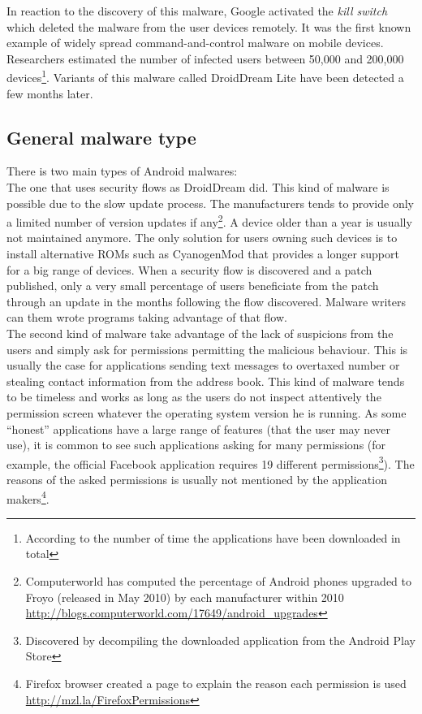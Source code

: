 In reaction to the discovery of this malware, Google activated the \emph{kill switch} which deleted the malware from the user devices remotely.
It was the first known example of widely spread command-and-control malware on mobile devices.
Researchers estimated the number of infected users between 50,000 and 200,000 devices\footnote{According to the number of time the applications have been downloaded in total}.
Variants of this malware called DroidDream Lite have been detected a few months later.

\subsection{General malware type}

There is two main types of Android malwares:\\

The one that uses security flows as DroidDream did.
This kind of malware is possible due to the slow update process.
The manufacturers tends to provide only a limited number of version updates if any\footnote{Computerworld has computed the percentage of Android phones upgraded to Froyo (released in May 2010) by each manufacturer within 2010 \url{http://blogs.computerworld.com/17649/android_upgrades}}.
A device older than a year is usually not maintained anymore.
The only solution for users owning such devices is to install alternative ROMs such as CyanogenMod that provides a longer support for a big range of devices.
When a security flow is discovered and a patch published, only a very small percentage of users beneficiate from the patch through an update in the months following the flow discovered.
Malware writers can them wrote programs taking advantage of that flow.\\

The second kind of malware take advantage of the lack of suspicions from the users and simply ask for permissions permitting the malicious behaviour.
This is usually the case for applications sending text messages to overtaxed number or stealing contact information from the address book.
This kind of malware tends to be timeless and works as long as the users do not inspect attentively the permission screen whatever the operating system version he is running.
As some ``honest'' applications have a large range of features (that the user may never use), it is common to see such applications asking for many permissions (for example, the official Facebook application requires 19 different permissions\footnote{Discovered by decompiling the downloaded application from the Android Play Store}).
The reasons of the asked permissions is usually not mentioned by the application makers\footnote{Firefox browser created a page to explain the reason each permission is used \url{http://mzl.la/FirefoxPermissions}}.

